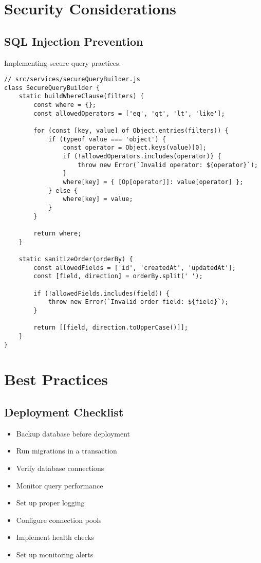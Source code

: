 \documentclass[12pt,a4paper]{book}
\begin{document}
	\section{Security Considerations}
	
	\subsection{SQL Injection Prevention}
	Implementing secure query practices:
	
	\begin{verbatim}
// src/services/secureQueryBuilder.js
class SecureQueryBuilder {
	static buildWhereClause(filters) {
		const where = {};
		const allowedOperators = ['eq', 'gt', 'lt', 'like'];
		
		for (const [key, value] of Object.entries(filters)) {
			if (typeof value === 'object') {
				const operator = Object.keys(value)[0];
				if (!allowedOperators.includes(operator)) {
					throw new Error(`Invalid operator: ${operator}`);
				}
				where[key] = { [Op[operator]]: value[operator] };
			} else {
				where[key] = value;
			}
		}
		
		return where;
	}
	
	static sanitizeOrder(orderBy) {
		const allowedFields = ['id', 'createdAt', 'updatedAt'];
		const [field, direction] = orderBy.split(' ');
		
		if (!allowedFields.includes(field)) {
			throw new Error(`Invalid order field: ${field}`);
		}
		
		return [[field, direction.toUpperCase()]];
	}
}
	\end{verbatim}
	
	\section{Best Practices}
	
	\subsection{Deployment Checklist}
	\begin{itemize}
		\item Backup database before deployment
		\item Run migrations in a transaction
		\item Verify database connections
		\item Monitor query performance
		\item Set up proper logging
		\item Configure connection pools
		\item Implement health checks
		\item Set up monitoring alerts
	\end{itemize}
	
\end{document}
